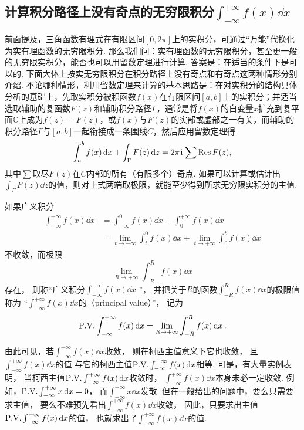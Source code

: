 \subsection{计算积分路径上没有奇点的无穷限积分\texorpdfstring{\(\int_{-\infty}^{+\infty} f(x) \dd{x}\)}{}}
前面提及，三角函数有理式在有限区间\([0,2\pi]\)上的实积分，可通过“万能”代换化为实有理函数的无穷限积分.
那么我们问：实有理函数的无穷限积分，甚至更一般的无穷限实积分，能否也可以用留数定理进行计算.
答案是：在适当的条件下是可以的.
下面大体上按实无穷限积分在积分路径上没有奇点和有奇点这两种情形分别介绍.
不论哪种情形，利用留数定理来计算的基本思路是：在对实积分的结构具体分析的基础上，先取实积分被积函数\(f(x)\)在有限区间\([a,b]\)上的实积分；并适当选取辅助的复函数\(F(z)\)和辅助积分路径\(\Gamma\)，通常是将\(f(x)\)的自变量\(x\)扩充到复平面\(\mathbb{C}\)上成为\(f(z)=F(z)\)，或\(f(x)\)与\(F(z)\)的实部或虚部之一有关，而辅助的积分路径\(\Gamma\)与\([a,b]\)一起衔接成一条围线\(C\)，然后应用留数定理得\begin{equation}
\int_a^b f(x) \dd{x}
+ \int_\Gamma F(z) \dd{z}
= 2\pi\kern1pt\mathrm{i}\kern1pt \sum \operatorname{Res} F(z),
\end{equation}
其中\(\sum\)取尽\(F(z)\)在\(C\)内部的所有（有限多个）奇点.
如果可以计算或估计出\(\int_\Gamma F(z) \dd{z}\)的值，则对上式两端取极限，就能至少得到所求无穷限实积分的主值.

如果广义积分\begin{align*}
\int_{-\infty}^{+\infty} f(x) \dd{x}
&= \int_{-\infty}^0 f(x) \dd{x} + \int_0^{+\infty} f(x) \dd{x} \\
&= \lim_{t \to -\infty} \int_t^0 f(x) \dd{x}
	+ \lim_{t \to +\infty} \int_0^t f(x) \dd{x}
\end{align*}
不收敛，而极限\[
\lim_{R\to+\infty} \int_{-R}^R f(x) \dd{x}
\]存在，
则称“广义积分\(\int_{-\infty}^{+\infty} f(x) \dd{x}\) ”，
并把关于\(R\)的函数\(\int_{-R}^R f(x) \dd{x}\)的极限值称为%
“\(\int_{-\infty}^{+\infty} f(x) \dd{x}\)的（principal value）”，
记为\[
	\pvint f(x) \dd{x}
	= \lim_{R\to+\infty} \int_{-R}^R f(x) \dd{x}.
\]

由此可见，若\(\int_{-\infty}^{+\infty} f(x) \dd{x}\)收敛，
则在柯西主值意义下它也收敛，
且\(\int_{-\infty}^{+\infty} f(x) \dd{x}\)的值
与它的柯西主值\(\pvint f(x) \dd{x}\)相等.
可是，有大量实例表明，
当柯西主值\(\pvint f(x) \dd{x}\)收敛时，
\(\int_{-\infty}^{+\infty} f(x) \dd{x}\)本身未必一定收敛.
例如，\(\pvint x \dd{x} = 0\)，
而\(\int_{-\infty}^{+\infty} x \dd{x}\)发散.
但在一般给出的问题中，要么只需要求主值，
要么不难预先看出\(\int_{-\infty}^{+\infty} f(x) \dd{x}\)收敛，
因此，只要求出主值\(\pvint f(x) \dd{x}\)的值，
也就求出了\(\int_{-\infty}^{+\infty} f(x) \dd{x}\)的值.

